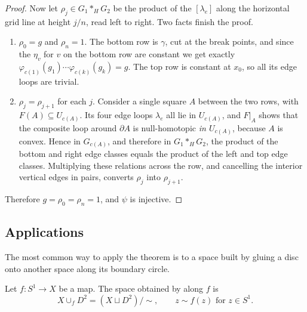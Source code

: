 \documentclass[a4paper]{scrartcl}
\begin{document}
\begin{proof}
	Now let $\rho_j \in G_1*_HG_2$ be the product of the $[\lambda_e]$ along the horizontal grid line at height $j/n$, read left to right. Two facts finish the proof.
	\begin{enumerate}
		\item $\rho_0 = g$ and $\rho_n = 1$. The bottom row is $\gamma$, cut at the break points, and since the $\eta_v$ for $v$ on the bottom row are constant we get exactly $\varphi_{c(1)}(g_1)\cdots\varphi_{c(k)}(g_k) = g$. The top row is constant at $x_0$, so all its edge loops are trivial.
		\item $\rho_j = \rho_{j+1}$ for each $j$. Consider a single square $A$ between the two rows, with $F(A) \subseteq U_{c(A)}$. Its four edge loops $\lambda_e$ all lie in $U_{c(A)}$, and $F|_A$ shows that the composite loop around $\partial A$ is null-homotopic \emph{in $U_{c(A)}$}, because $A$ is convex. Hence in $G_{c(A)}$, and therefore in $G_1 *_H G_2$, the product of the bottom and right edge classes equals the product of the left and top edge classes. Multiplying these relations across the row, and cancelling the interior vertical edges in pairs, converts $\rho_j$ into $\rho_{j+1}$.
	\end{enumerate}
	Therefore $g = \rho_0 = \rho_n = 1$, and $\psi$ is injective.
\end{proof}

\begin{center}
\end{center}

\subsection{Applications}

The most common way to apply the theorem is to a space built by gluing a disc onto
another space along its boundary circle.

\begin{definition}
	Let $f: S^1 \to X$ be a map. The space obtained by  along $f$ is
	$$
	X \cup_f D^2 = (X \sqcup D^2)/\!\sim, \qquad z \sim f(z) \text{ for } z \in S^1 .
	$$
\end{definition}
\end{document}

